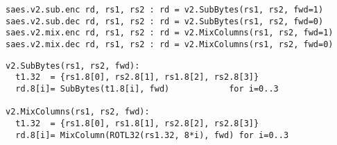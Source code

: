 

\begin{lstlisting}[language=pseudo,style=block]
saes.v2.sub.enc rd, rs1, rs2 : rd = v2.SubBytes(rs1, rs2, fwd=1)
saes.v2.sub.dec rd, rs1, rs2 : rd = v2.SubBytes(rs1, rs2, fwd=0)
saes.v2.mix.enc rd, rs1, rs2 : rd = v2.MixColumns(rs1, rs2, fwd=1)
saes.v2.mix.dec rd, rs1, rs2 : rd = v2.MixColumns(rs1, rs2, fwd=0)
\end{lstlisting}


\begin{lstlisting}[language=pseudo,style=block]
v2.SubBytes(rs1, rs2, fwd):
  t1.32  = {rs1.8[0], rs2.8[1], rs1.8[2], rs2.8[3]}
  rd.8[i]= SubBytes(t1.8[i], fwd)            for i=0..3

v2.MixColumns(rs1, rs2, fwd):
  t1.32  = {rs1.8[0], rs1.8[1], rs2.8[2], rs2.8[3]}
  rd.8[i]= MixColumn(ROTL32(rs1.32, 8*i), fwd) for i=0..3
\end{lstlisting}


